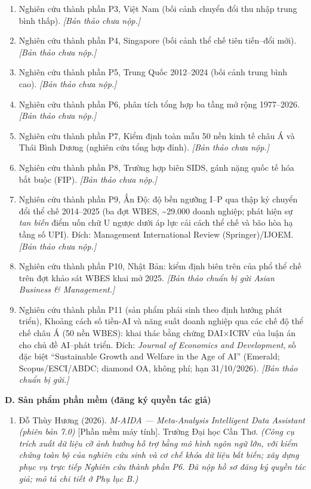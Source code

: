 \documentclass[
  a4paper,
  13pt]{extreport}
\providecommand{\tightlist}{%
  \setlength{\itemsep}{0pt}\setlength{\parskip}{0pt}}
\begin{document}
\begin{enumerate}
\def\labelenumi{\arabic{enumi}.}
\setcounter{enumi}{4}
\tightlist
\item
  Nghiên cứu thành phần P3, Việt Nam (bối cảnh chuyển đổi thu nhập trung
  bình thấp). \emph{{[}Bản thảo chưa nộp.{]}}
\item
  Nghiên cứu thành phần P4, Singapore (bối cảnh thể chế tiên tiến--đổi
  mới). \emph{{[}Bản thảo chưa nộp.{]}}
\item
  Nghiên cứu thành phần P5, Trung Quốc 2012--2024 (bối cảnh trung bình
  cao). \emph{{[}Bản thảo chưa nộp.{]}}
\item
  Nghiên cứu thành phần P6, phân tích tổng hợp ba tầng mở rộng
  1977--2026. \emph{{[}Bản thảo chưa nộp.{]}}
\item
  Nghiên cứu thành phần P7, Kiểm định toàn mẫu 50 nền kinh tế châu Á và
  Thái Bình Dương (nghiên cứu tổng hợp đỉnh). \emph{{[}Bản thảo chưa
  nộp.{]}}
\item
  Nghiên cứu thành phần P8, Trường hợp biên SIDS, gánh nặng quốc tế hóa
  bắt buộc (FIP). \emph{{[}Bản thảo chưa nộp.{]}}
\item
  Nghiên cứu thành phần P9, Ấn Độ: độ bền ngưỡng I--P qua thập kỷ chuyển
  đổi thể chế 2014--2025 (ba đợt WBES, \textasciitilde29.000 doanh
  nghiệp; phát hiện sự \emph{tan biến} điểm uốn chữ U ngược dưới áp lực
  cải cách thể chế và bão hòa hạ tầng số UPI). Đích: Management
  International Review (Springer)/IJOEM. \emph{{[}Bản thảo chưa nộp.{]}}
\item
  Nghiên cứu thành phần P10, Nhật Bản: kiểm định biên trên của phổ thể
  chế trên đợt khảo sát WBES khai mở 2025. \emph{{[}Bản thảo chuẩn bị
  gửi Asian Business \& Management.{]}}
\item
  Nghiên cứu thành phần P11 (sản phẩm phái sinh theo định hướng phát
  triển), Khoảng cách số tiền-AI và năng suất doanh nghiệp qua các chế
  độ thể chế châu Á (50 nền WBES): khai thác bằng chứng DAI×ICRV của
  luận án cho chủ đề AI--phát triển. Đích: \emph{Journal of Economics
  and Development}, số đặc biệt ``Sustainable Growth and Welfare in the
  Age of AI'' (Emerald; Scopus/ESCI/ABDC; diamond OA, không phí; hạn
  31/10/2026). \emph{{[}Bản thảo chuẩn bị gửi.{]}}
\end{enumerate}

\textbf{D. Sản phẩm phần mềm (đăng ký quyền tác giả)}

\begin{enumerate}
\def\labelenumi{\arabic{enumi}.}
\setcounter{enumi}{13}
\tightlist
\item
  Đỗ Thùy Hương (2026). \emph{M-AIDA --- Meta-Analysis Intelligent Data
  Assistant (phiên bản 7.0)} {[}Phần mềm máy tính{]}. Trường Đại học Cần
  Thơ. \emph{(Công cụ trích xuất dữ liệu cỡ ảnh hưởng hỗ trợ bằng mô
  hình ngôn ngữ lớn, với kiểm chứng toàn bộ của nghiên cứu sinh và cơ
  chế khóa dữ liệu bất biến; xây dựng phục vụ trực tiếp Nghiên cứu thành
  phần P6. Đã nộp hồ sơ đăng ký quyền tác giả; mô tả chi tiết ở Phụ lục
  B.)}
\end{enumerate}
\end{document}

